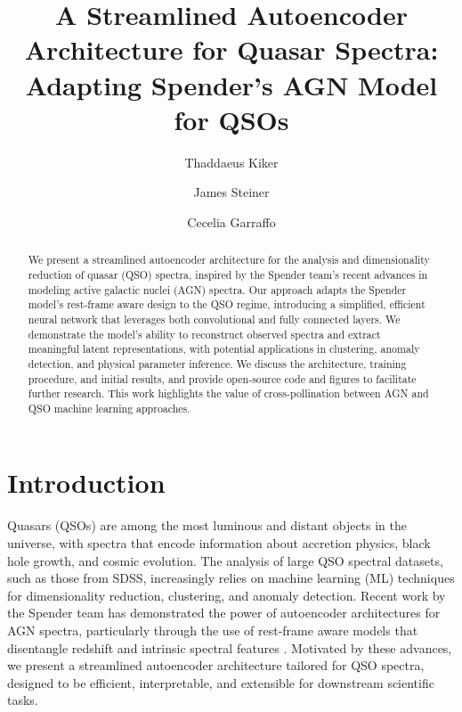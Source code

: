 \documentclass[twocolumn]{aastex631} %
\begin{document}
\title{A Streamlined Autoencoder Architecture for Quasar Spectra: Adapting Spender's AGN Model for QSOs}

\author[0000-0002-2363-2487]{Thaddaeus Kiker}

\author[]{James Steiner}
\affiliation{}


\author{Cecelia Garraffo}
\affiliation{}


\begin{abstract} %
We present a streamlined autoencoder architecture for the analysis and dimensionality reduction of quasar (QSO) spectra, inspired by the Spender team's recent advances in modeling active galactic nuclei (AGN) spectra. Our approach adapts the Spender model's rest-frame aware design to the QSO regime, introducing a simplified, efficient neural network that leverages both convolutional and fully connected layers. We demonstrate the model's ability to reconstruct observed spectra and extract meaningful latent representations, with potential applications in clustering, anomaly detection, and physical parameter inference. We discuss the architecture, training procedure, and initial results, and provide open-source code and figures to facilitate further research. This work highlights the value of cross-pollination between AGN and QSO machine learning approaches.
\end{abstract}


\section{Introduction} \label{sec:intro}
Quasars (QSOs) are among the most luminous and distant objects in the universe, with spectra that encode information about accretion physics, black hole growth, and cosmic evolution. The analysis of large QSO spectral datasets, such as those from SDSS, increasingly relies on machine learning (ML) techniques for dimensionality reduction, clustering, and anomaly detection. Recent work by the Spender team has demonstrated the power of autoencoder architectures for AGN spectra, particularly through the use of rest-frame aware models that disentangle redshift and intrinsic spectral features \citep{spender2022}. Motivated by these advances, we present a streamlined autoencoder architecture tailored for QSO spectra, designed to be efficient, interpretable, and extensible for downstream scientific tasks.
\end{document}
